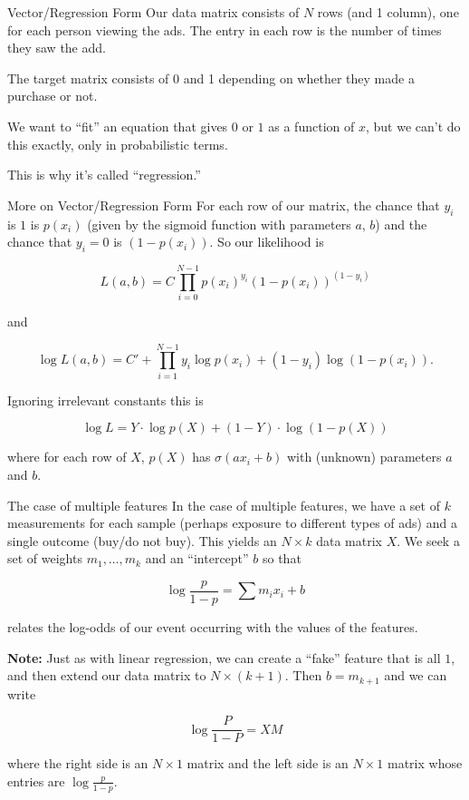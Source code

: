 \documentclass[
  ignorenonframetext,
]{beamer}
\begin{document}
\begin{frame}{Vector/Regression Form}
\protect\hypertarget{vectorregression-form}{}
Our data matrix consists of \(N\) rows (and 1 column), one for each
person viewing the ads. The entry in each row is the number of times
they saw the add.

The target matrix consists of 0 and 1 depending on whether they made a
purchase or not.

We want to ``fit'' an equation that gives \(0\) or \(1\) as a function
of \(x\), but we can't do this exactly, only in probabilistic terms.

This is why it's called ``regression.''
\end{frame}

\begin{frame}{More on Vector/Regression Form}
\protect\hypertarget{more-on-vectorregression-form}{}
For each row of our matrix, the chance that \(y_i\) is \(1\) is
\(p(x_i)\) (given by the sigmoid function with parameters \(a\), \(b\))
and the chance that \(y_i=0\) is \((1-p(x_i))\). So our likelihood is

\[
L(a,b) = C \prod_{i=0}^{N-1} p(x_i)^{y_{i}}(1-p(x_i))^{(1-y_i)}
\]

and

\[
\log L(a,b) = C'+\prod_{i=1}^{N-1} y_{i} \log p(x_i) + (1-y_{i})\log(1-p(x_i)).
\]

Ignoring irrelevant constants this is

\[
\log L = Y\cdot\log p(X) + (1-Y)\cdot\log(1-p(X))
\]

where for each row of \(X\), \(p(X)\) has \(\sigma(ax_i+b)\) with
(unknown) parameters \(a\) and \(b\).
\end{frame}

\begin{frame}{The case of multiple features}
\protect\hypertarget{the-case-of-multiple-features}{}
In the case of multiple features, we have a set of \(k\) measurements
for each sample (perhaps exposure to different types of ads) and a
single outcome (buy/do not buy). This yields an \(N\times k\) data
matrix \(X\). We seek a set of weights \(m_{1},\ldots, m_{k}\) and an
``intercept'' \(b\) so that

\[
\log\frac{p}{1-p}=\sum m_{i}x_{i}+b
\]

relates the log-odds of our event occurring with the values of the
features.

\textbf{Note:} Just as with linear regression, we can create a ``fake''
feature that is all \(1\), and then extend our data matrix to
\(N\times (k+1)\). Then \(b=m_{k+1}\) and we can write

\[
\log\frac{P}{1-P}=XM
\]

where the right side is an \(N\times 1\) matrix and the left side is an
\(N\times 1\) matrix whose entries are \(\log\frac{p}{1-p}\).
\end{frame}
\end{document}
